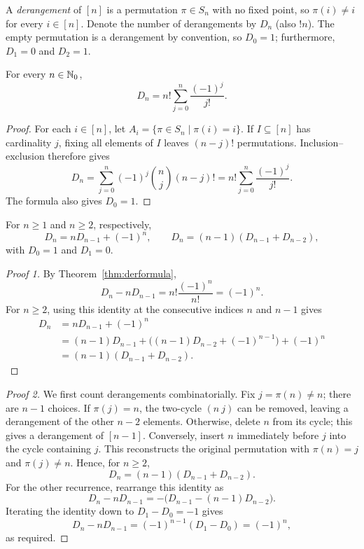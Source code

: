 \documentclass[11pt, oneside]{article}
\begin{document}
\begin{definition}[Derangements]
A \emph{derangement} of $[n]$ is a permutation $\pi\in S_n$ with no fixed point, so $\pi(i)\ne i$ for every $i\in[n]$. Denote the number of derangements by $D_n$ (also $!n$). The empty permutation is a derangement by convention, so $D_0=1$; furthermore, $D_1=0$ and $D_2=1$.
\end{definition}
\begin{theorem}\label{thm:derformula}
For every $n\in\mathbb{N}_0$,
\[
D_n=n!\sum_{j=0}^n\frac{(-1)^j}{j!}.
\]
\end{theorem}
\begin{proof}
For each $i\in[n]$, let $A_i=\{\pi\in S_n\mid\pi(i)=i\}$. If $I\subseteq[n]$ has cardinality $j$, fixing all elements of $I$ leaves $(n-j)!$ permutations. Inclusion--exclusion therefore gives
\[
D_n=\sum_{j=0}^n(-1)^j\binom nj(n-j)!
=n!\sum_{j=0}^n\frac{(-1)^j}{j!}.
\]
The formula also gives $D_0=1$.
\end{proof}
\begin{theorem}\label{thm:derrec}
For $n\ge1$ and $n\ge2$, respectively,
\[
D_n=nD_{n-1}+(-1)^n, \qquad
D_n=(n-1)(D_{n-1}+D_{n-2}),
\]
with $D_0=1$ and $D_1=0$.
\end{theorem}
\begin{proof}[Proof 1]
By Theorem~\ref{thm:derformula},
\[
D_n-nD_{n-1}=n!\frac{(-1)^n}{n!}=(-1)^n.
\]
For $n\ge2$, using this identity at the consecutive indices $n$ and $n-1$ gives
\[
\begin{aligned}
D_n&=nD_{n-1}+(-1)^n\\
&=(n-1)D_{n-1}+\bigl((n-1)D_{n-2}+(-1)^{n-1}\bigr)+(-1)^n\\
&=(n-1)(D_{n-1}+D_{n-2}).
\end{aligned}
\]
\end{proof}
\begin{proof}[Proof 2]
We first count derangements combinatorially. Fix $j=\pi(n)\ne n$; there are $n-1$ choices. If $\pi(j)=n$, the two-cycle $(n\ j)$ can be removed, leaving a derangement of the other $n-2$ elements. Otherwise, delete $n$ from its cycle; this gives a derangement of $[n-1]$. Conversely, insert $n$ immediately before $j$ into the cycle containing $j$. This reconstructs the original permutation with $\pi(n)=j$ and $\pi(j)\ne n$. Hence, for $n\ge2$,
\[
D_n=(n-1)(D_{n-1}+D_{n-2}).
\]
For the other recurrence, rearrange this identity as
\[
D_n-nD_{n-1}=-\bigl(D_{n-1}-(n-1)D_{n-2}\bigr).
\]
Iterating the identity down to $D_1-D_0=-1$ gives
\[
D_n-nD_{n-1}=(-1)^{n-1}(D_1-D_0)=(-1)^n,
\]
as required.
\end{proof}
\end{document}
